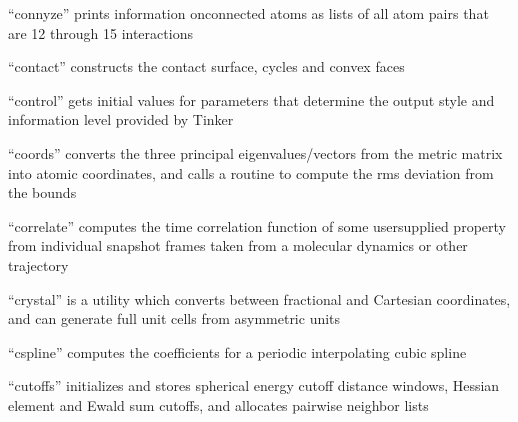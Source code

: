 \documentclass[letterpaper,11pt,english]{sphinxmanual}
\begin{document}
\sphinxAtStartPar
{}

\sphinxAtStartPar
“connyze” prints information onconnected atoms as lists of all atom pairs that are 1\sphinxhyphen{}2 through 1\sphinxhyphen{}5 interactions

\sphinxAtStartPar
{}

\sphinxAtStartPar
“contact” constructs the contact surface, cycles and convex faces

\sphinxAtStartPar
{}

\sphinxAtStartPar
“control” gets initial values for parameters that determine the output style and information level provided by Tinker

\sphinxAtStartPar
{}

\sphinxAtStartPar
“coords” converts the three principal eigenvalues/vectors from the metric matrix into atomic coordinates, and calls a routine to compute the rms deviation from the bounds

\sphinxAtStartPar
{}

\sphinxAtStartPar
“correlate” computes the time correlation function of some user\sphinxhyphen{}supplied property from individual snapshot frames taken from a molecular dynamics or other trajectory

\sphinxAtStartPar
{}

\sphinxAtStartPar
{}

\sphinxAtStartPar
{}

\sphinxAtStartPar
{}

\sphinxAtStartPar
{}

\sphinxAtStartPar
“crystal” is a utility which converts between fractional and Cartesian coordinates, and can generate full unit cells from asymmetric units

\sphinxAtStartPar
{}

\sphinxAtStartPar
“cspline” computes the coefficients for a periodic interpolating cubic spline

\sphinxAtStartPar
{}

\sphinxAtStartPar
“cutoffs” initializes and stores spherical energy cutoff distance windows, Hessian element and Ewald sum cutoffs, and allocates pairwise neighbor lists
\end{document}
